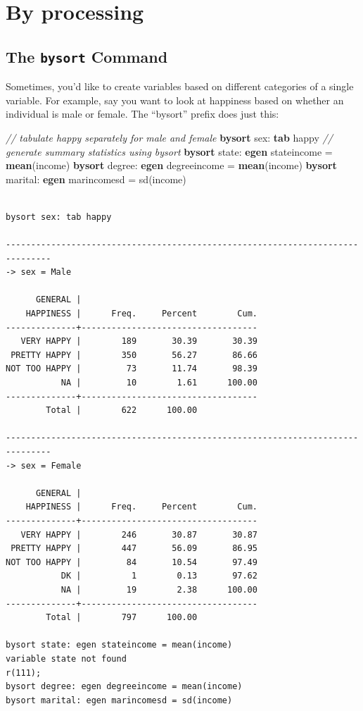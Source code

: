 \documentclass[
]{book}
\newenvironment{Shaded}{\begin{snugshade}}{\end{snugshade}}
\newcommand{\CommentTok}[1]{\textcolor[rgb]{0.56,0.35,0.01}{\textit{#1}}}
\newcommand{\FunctionTok}[1]{\textcolor[rgb]{0.00,0.00,0.00}{#1}}
\newcommand{\KeywordTok}[1]{\textcolor[rgb]{0.13,0.29,0.53}{\textbf{#1}}}
\newcommand{\NormalTok}[1]{#1}
\begin{document}
\hypertarget{by-processing}{%
\section{By processing}\label{by-processing}}

\hypertarget{the-bysort-command}{%
\subsection{\texorpdfstring{The \texttt{bysort} Command}{The bysort Command}}\label{the-bysort-command}}

Sometimes, you'd like to create variables based on different categories of a single variable. For example, say you want to look at happiness based on whether an individual is male or female. The ``bysort'' prefix does just this:

\begin{Shaded}
\begin{Highlighting}[]
  \CommentTok{// tabulate happy separately for male and female }
  \KeywordTok{bysort}\NormalTok{ sex: }\KeywordTok{tab}\NormalTok{ happy}
  \CommentTok{// generate summary statistics using bysort }
  \KeywordTok{bysort}\NormalTok{ state: }\KeywordTok{egen}\NormalTok{ stateincome = }\KeywordTok{mean}\NormalTok{(income)}
  \KeywordTok{bysort}\NormalTok{ degree: }\KeywordTok{egen}\NormalTok{ degreeincome = }\KeywordTok{mean}\NormalTok{(income)}
  \KeywordTok{bysort}\NormalTok{ marital: }\KeywordTok{egen}\NormalTok{ marincomesd = }\FunctionTok{sd}\NormalTok{(income)}
\end{Highlighting}
\end{Shaded}

\begin{verbatim}

bysort sex: tab happy

-------------------------------------------------------------------------------
-> sex = Male

      GENERAL |
    HAPPINESS |      Freq.     Percent        Cum.
--------------+-----------------------------------
   VERY HAPPY |        189       30.39       30.39
 PRETTY HAPPY |        350       56.27       86.66
NOT TOO HAPPY |         73       11.74       98.39
           NA |         10        1.61      100.00
--------------+-----------------------------------
        Total |        622      100.00

-------------------------------------------------------------------------------
-> sex = Female

      GENERAL |
    HAPPINESS |      Freq.     Percent        Cum.
--------------+-----------------------------------
   VERY HAPPY |        246       30.87       30.87
 PRETTY HAPPY |        447       56.09       86.95
NOT TOO HAPPY |         84       10.54       97.49
           DK |          1        0.13       97.62
           NA |         19        2.38      100.00
--------------+-----------------------------------
        Total |        797      100.00

bysort state: egen stateincome = mean(income)
variable state not found
r(111);
bysort degree: egen degreeincome = mean(income)
bysort marital: egen marincomesd = sd(income)
\end{verbatim}
\end{document}
